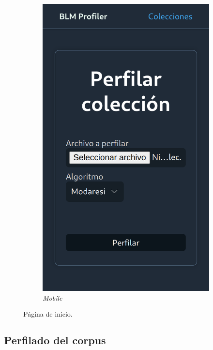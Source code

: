 \begin{figure}[H]
\begin{subfigure}{0.2215\textwidth}
       \includegraphics[width=\textwidth]{imaxes/capturas-app/mobile/home.png}
      \caption{\textit{Mobile}} 
  \end{subfigure}
  \caption{Página de inicio.}
  \label{fig:app/home}
\end{figure}
\subsection{Perfilado del corpus}

